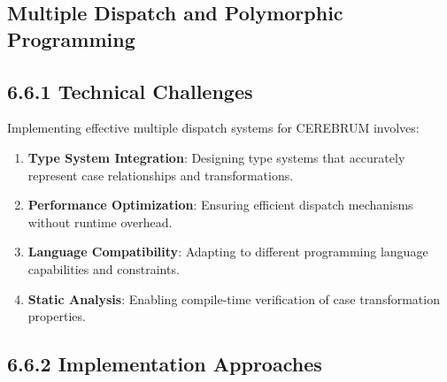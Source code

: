 \documentclass[
  11pt,
  letterpaper,
]{article}
\providecommand{\tightlist}{%
  \setlength{\itemsep}{0pt}\setlength{\parskip}{0pt}}
\begin{document}
\hypertarget{multiple-dispatch-and-polymorphic-programming}{%
\subsection{Multiple Dispatch and Polymorphic
Programming}\label{multiple-dispatch-and-polymorphic-programming}}

\hypertarget{technical-challenges-3}{%
\subsection{6.6.1 Technical Challenges}\label{technical-challenges-3}}

Implementing effective multiple dispatch systems for CEREBRUM involves:

\begin{enumerate}
\def\labelenumi{\arabic{enumi}.}
\tightlist
\item
  \textbf{Type System Integration}: Designing type systems that
  accurately represent case relationships and transformations.
\item
  \textbf{Performance Optimization}: Ensuring efficient dispatch
  mechanisms without runtime overhead.
\item
  \textbf{Language Compatibility}: Adapting to different programming
  language capabilities and constraints.
\item
  \textbf{Static Analysis}: Enabling compile-time verification of case
  transformation properties.
\end{enumerate}

\hypertarget{implementation-approaches}{%
\subsection{6.6.2 Implementation
Approaches}\label{implementation-approaches}}
\end{document}
